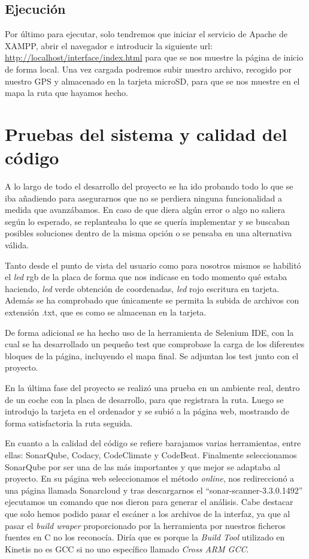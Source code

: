 \subsection{Ejecución}
Por último para ejecutar, solo tendremos que iniciar el servicio de Apache de XAMPP, abrir el navegador e introducir la siguiente url: \url{http://localhost/interface/index.html} para que se nos muestre la página de inicio de forma local. Una vez cargada podremos subir nuestro archivo, recogido por nuestro GPS y almacenado en la tarjeta microSD, para que se nos muestre en el mapa la ruta que hayamos hecho.

\section{Pruebas del sistema y calidad del código}
A lo largo de todo el desarrollo del proyecto se ha ido probando todo lo que se iba añadiendo para asegurarnos que no se perdiera ninguna funcionalidad a medida que avanzábamos. En caso de que diera algún error o algo no saliera según lo esperado, se replanteaba lo que se quería implementar y se buscaban posibles soluciones dentro de la misma opción o se pensaba en una alternativa válida.

Tanto desde el punto de vista del usuario como para nosotros mismos se habilitó el \textit{led} rgb de la placa de forma que nos indicase en todo momento qué estaba haciendo, \textit{led} verde obtención de coordenadas, \textit{led} rojo escritura en tarjeta. Además se ha comprobado que únicamente se permita la subida de archivos con extensión .txt, que es como se almacenan en la tarjeta.

De forma adicional se ha hecho uso de la herramienta de Selenium IDE, con la cual se ha desarrollado un pequeño test que comprobase la carga de los diferentes bloques de la página, incluyendo el mapa final. Se adjuntan los test junto con el proyecto.

En la última fase del proyecto se realizó una prueba en un ambiente real, dentro de un coche con la placa de desarrollo, para que registrara la ruta. Luego se introdujo la tarjeta en el ordenador y se subió a la página web, mostrando de forma satisfactoria la ruta seguida.

En cuanto a la calidad del código se refiere barajamos varias herramientas, entre ellas: SonarQube, Codacy, CodeClimate y CodeBeat. Finalmente seleccionamos SonarQube por ser una de las más importantes y que mejor se adaptaba al proyecto. En su página web seleccionamos el método \textit{online}, nos redireccionó a una página llamada Sonarcloud y tras descargarnos el ``sonar-scanner-3.3.0.1492'' ejecutamos un comando que nos dieron para generar el análisis. Cabe destacar que solo hemos podido pasar el escáner a los archivos de la interfaz, ya que al pasar el \textit{build wraper} proporcionado por la herramienta por nuestros ficheros fuentes en C no los reconocía. Diría que es porque la \textit{Build Tool} utilizado en Kinetis no es GCC si no uno específico llamado \textit{Cross ARM GCC}. 

